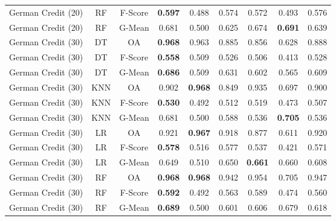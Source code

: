 \begin{longtable}{ccccccccc}
German Credit (20) &         RF & F-Score & \textbf{0.597} &          0.488 &          0.574 &          0.572 &          0.493 &          0.576 \\
German Credit (20) &         RF &  G-Mean &          0.681 &          0.500 &          0.625 &          0.674 & \textbf{0.691} &          0.639 \\
German Credit (30) &         DT &      OA & \textbf{0.968} &          0.963 &          0.885 &          0.856 &          0.628 &          0.888 \\
German Credit (30) &         DT & F-Score & \textbf{0.558} &          0.509 &          0.526 &          0.506 &          0.413 &          0.528 \\
German Credit (30) &         DT &  G-Mean & \textbf{0.686} &          0.509 &          0.631 &          0.602 &          0.565 &          0.609 \\
German Credit (30) &        KNN &      OA &          0.902 & \textbf{0.968} &          0.849 &          0.935 &          0.697 &          0.900 \\
German Credit (30) &        KNN & F-Score & \textbf{0.530} &          0.492 &          0.512 &          0.519 &          0.473 &          0.507 \\
German Credit (30) &        KNN &  G-Mean &          0.681 &          0.500 &          0.588 &          0.536 & \textbf{0.705} &          0.536 \\
German Credit (30) &         LR &      OA &          0.921 & \textbf{0.967} &          0.918 &          0.877 &          0.611 &          0.920 \\
German Credit (30) &         LR & F-Score & \textbf{0.578} &          0.516 &          0.577 &          0.537 &          0.421 &          0.571 \\
German Credit (30) &         LR &  G-Mean &          0.649 &          0.510 &          0.650 & \textbf{0.661} &          0.660 &          0.608 \\
German Credit (30) &         RF &      OA & \textbf{0.968} & \textbf{0.968} &          0.942 &          0.954 &          0.705 &          0.947 \\
German Credit (30) &         RF & F-Score & \textbf{0.592} &          0.492 &          0.563 &          0.589 &          0.474 &          0.560 \\
German Credit (30) &         RF &  G-Mean & \textbf{0.689} &          0.500 &          0.601 &          0.606 &          0.679 &          0.618 \\

\end{longtable}
